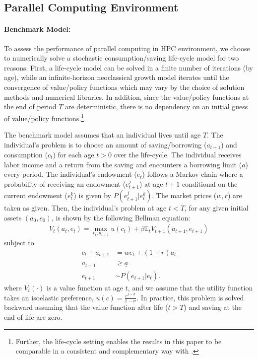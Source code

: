 \documentclass[12pt]{article}
\begin{document}
\subsection{Parallel Computing Environment}
\paragraph{Benchmark Model:}
To assess the performance of parallel computing in HPC environment, we choose to numerically solve a stochastic consumption/saving life-cycle model for two reasons. First, a life-cycle model can be solved in a finite number of iterations (by age), while an infinite-horizon neoclassical growth model iterates until the convergence of value/policy functions which may vary by the choice of solution methods and numerical libraries. In addition, since the value/policy functions at the end of period $T$ are deterministic, there is no dependency on an initial guess of value/policy functions.\footnote{\sf Further, the life-cycle setting enables the results in this paper to be comparable in a consistent and complementary way with \cite{Fernandez-Villaverde-Valencia-18}.}

The benchmark model assumes that an individual lives until age $T$. The individual's problem is to choose an amount of saving/borrowing ($a_{t+1}$) and consumption ($c_t$) for each age $t>0$ over the life-cycle. The individual receives labor income and a return from the saving and encounters a borrowing limit ($\underline{a}$) every period. The individual's endowment ($e_t$) follows a Markov chain where a probability of receiving an endowment ($e^j_{t+1}$) at age $t+1$ conditional on the current endowment ($e^k_t$) is given by $P(e^j_{t+1}|e^k_{t})$. The market prices ($w,r$) are taken as given. Then, the individual's problem at age $t<T$, for any given initial assets $(a_0,e_0)$, is shown by the following Bellman equation:
\begin{align*}
V_t(a_{t},e_t) = \max_{c_t,a_{t+1}} u(c_{t}) + \beta \mathbb{E}_t V_{t+1}(a_{t+1},e_{t+1})
\end{align*}
subject to
\begin{align*}
c_t + a_{t+1} 	&= w e_t + (1+r)a_t \\
a_{t+1} 		&\geq \underline{a}\\
e_{t+1} 		&\sim P(e_{t+1}|e_t).
\end{align*}
where $V_t(\cdot)$ is a value function at age $t$, and we assume that the utility function takes an isoelastic preference, $u(c) = \frac{c^{1-\sigma}}{1-\sigma}$. In practice, this problem is solved backward assuming that the value function after life ($t>T$) and saving at the end of life are zero.
\end{document}
